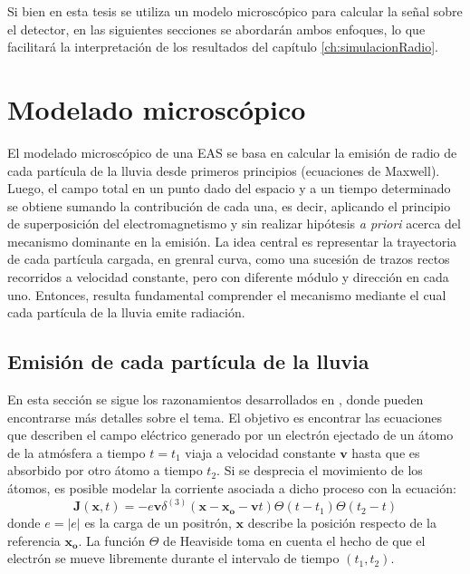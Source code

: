 Si bien en esta tesis se utiliza un modelo microsc\'opico para calcular la se\~nal sobre el detector, en las siguientes secciones se abordar\'an ambos enfoques, lo que facilitar\'a la interpretaci\'on de los resultados del cap\'itulo \ref{ch:simulacionRadio}.

\section{Modelado microsc\'opico}

El modelado microsc\'opico de una EAS se basa en calcular la emisi\'on de radio de cada part\'icula de la lluvia desde primeros principios (ecuaciones de Maxwell).
Luego, el campo total en un punto dado del espacio y a un tiempo determinado se obtiene sumando la contribuci\'on de cada una, es decir, aplicando el principio de superposici\'on del electromagnetismo y sin realizar hip\'otesis \emph{a priori} acerca del mecanismo dominante en la emisi\'on.
La idea central es representar la trayectoria de cada part\'icula cargada, en grenral curva, como una sucesi\'on de trazos rectos recorridos a velocidad constante, pero con diferente m\'odulo y direcci\'on en cada uno.
Entonces, resulta fundamental comprender el mecanismo mediante el cual cada part\'icula de la lluvia emite radiaci\'on.

\subsection{Emisi\'on de cada part\'icula de la lluvia}

En esta secci\'on se sigue los razonamientos desarrollados en \cite{alvarez:2013}, donde pueden encontrarse m\'as detalles sobre el tema.
El objetivo es encontrar las ecuaciones que describen el campo el\'ectrico generado por un electr\'on ejectado de un \'atomo de la atm\'osfera a tiempo $t=t_1$ viaja a velocidad constante $\mathbf{v}$ hasta que es absorbido por otro \'atomo a tiempo $t_2$.
Si se desprecia el movimiento de los \'atomos, es posible modelar la corriente asociada a dicho proceso con la ecuaci\'on:
%
\begin{equation}
\mathbf{J}(\mathbf{x},t)=-e\mathbf{v}\delta^{(3)}(\mathbf{x}-\mathbf{x_o}-\mathbf{v}t)
\Theta(t-t_1)\Theta(t_2-t)
\label{eq:eCurrent}
\end{equation}
%
donde $e=|e|$ es la carga de un positr\'on, $\mathbf{x}$ describe la posici\'on respecto de la referencia $\mathbf{x_o}$.
La funci\'on $\Theta$ de Heaviside toma en cuenta el hecho de que el electr\'on se mueve libremente durante el intervalo de tiempo $(t_1,t_2)$.

